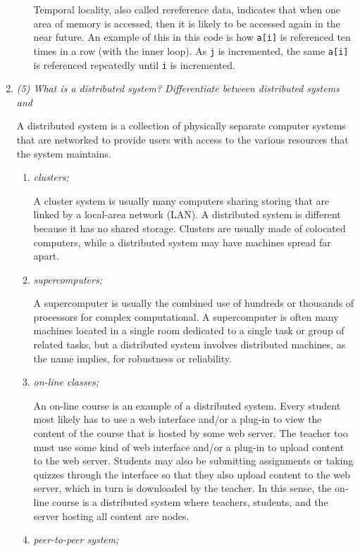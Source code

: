 \documentclass[letterpaper,11pt]{article}
\newcommand{\inlinecode}{\texttt}
\begin{document}
\begin{enumerate}
\begin{enumerate}
    Temporal locality, also called rereference data, indicates that when one area of memory is accessed, then it is likely to be accessed again in the near future.  An example of this in this code is how \inlinecode{a[i]} is referenced ten times in a row (with the inner loop).  As \inlinecode{j} is incremented, the same \inlinecode{a[i]} is referenced repeatedly until \inlinecode{i} is incremented.
  \end{enumerate}
  \item \emph{(5) What is a distributed system? Differentiate between distributed systems and}

  A distributed system is a collection of physically separate computer systems that are networked to provide users with access to the various resources that the system maintains.
  \begin{enumerate}
    \item \emph{clusters;}

    A cluster system is usually many computers sharing storing that are linked by a local-area network (LAN).  A distributed system is different because it has no shared storage.  Clusters are usually made of colocated computers, while a distributed system may have machines spread far apart.
    \item \emph{supercomputers;}

    A supercomputer is usually the combined use of hundreds or thousands of processors for complex computational.  A supercomputer is often many machines located in a single room dedicated to a single task or group of related tasks, but a distributed system involves distributed machines, as the name implies, for robustness or reliability.
    \item \emph{on-line classes;}

    An on-line course is an example of a distributed system.  Every student most likely has to use a web interface and/or a plug-in to view the content of the course that is hosted by some web server.  The teacher too must use some kind of web interface and/or a plug-in to upload content to the web server.  Students may also be submitting assignments or taking quizzes through the interface so that they also upload content to the web server, which in turn is downloaded by the teacher.  In this sense, the on-line course is a distributed system where teachers, students, and the server hosting all content are nodes.
    \item \emph{peer-to-peer system;}


\end{enumerate}
\end{enumerate}
\end{document}
